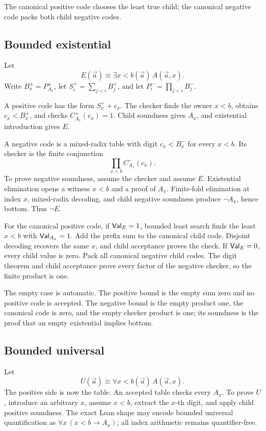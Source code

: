 The canonical positive code chooses the least true child; the canonical
negative code packs both child negative codes.

\subsection{Bounded existential}

Let
\[
 E(\vec a)\equiv\exists x<b(\vec a)\,A(\vec a,x).
\]
Write \(B_x^\pm=P_{A_x}^\pm\), let \(S_i^+=\sum_{j<i}B_j^+\), and let
\(P_i^-=\prod_{j<i}B_j^-\).

A positive code has the form \(S_x^++c_x\).  The checker finds the owner
\(x<b\), obtains \(c_x<B_x^+\), and checks \(C_{A_x}^+(c_x)=1\).  Child
soundness gives \(A_x\), and existential introduction gives \(E\).

A negative code is a mixed-radix table with digit
\(c_x<B_x^-\) for every \(x<b\).  Its checker is the finite conjunction
\[
 \prod_{x<b} C_{A_x}^-(c_x).
\]
To prove negative soundness, assume the checker and assume \(E\).  Existential
elimination opens a witness \(x<b\) and a proof of \(A_x\).  Finite-fold
elimination at index \(x\), mixed-radix decoding, and child negative soundness
produce \(\neg A_x\), hence bottom.  Thus \(\neg E\).

For the canonical positive code, if \(\mathsf{Val}_E=1\), bounded least search finds
the least \(x<b\) with \(\mathsf{Val}_{A_x}=1\).  Add the prefix sum to the canonical
child code.  Disjoint decoding recovers the same \(x\), and child acceptance
proves the check.  If \(\mathsf{Val}_E=0\), every child value is zero.  Pack all
canonical negative child codes.  The digit theorem and child acceptance prove
every factor of the negative checker, so the finite product is one.

The empty case is automatic.  The positive bound is the empty sum zero and no
positive code is accepted.  The negative bound is the empty product one, the
canonical code is zero, and the empty checker product is one; its soundness is
the proof that an empty existential implies bottom.

\subsection{Bounded universal}

Let
\[
 U(\vec a)\equiv\forall x<b(\vec a)\,A(\vec a,x).
\]
The positive side is now the table.  An accepted table checks every
\(A_x\).  To prove \(U\), introduce an arbitrary \(x\), assume \(x<b\),
extract the \(x\)-th digit, and apply child positive soundness.  The exact Lean
shape may encode bounded universal quantification as
\(\forall x\,(x<b\to A_x)\); all index arithmetic remains quantifier-free.

